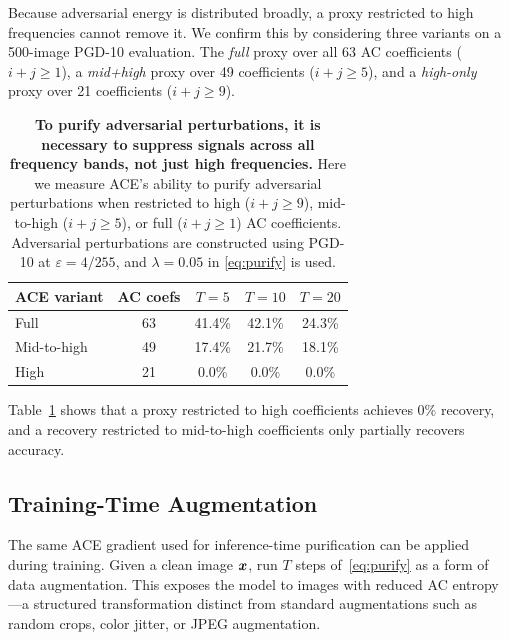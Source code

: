 Because adversarial energy is distributed broadly, a proxy restricted to high frequencies cannot remove it.
We confirm this by considering three variants on a 500-image PGD-10 evaluation.
The \emph{full} proxy over all 63 AC coefficients ($i{+}j\ge1$), a \emph{mid+high} proxy over 49 coefficients ($i{+}j\ge5$), and a \emph{high-only} proxy over 21 coefficients ($i{+}j\ge9$).

\begin{table}[ht]
  \centering
  \caption{
  \textbf{To purify adversarial perturbations, it is necessary to suppress signals across all frequency bands, not just high frequencies.}
  Here we measure ACE's ability to purify adversarial perturbations when restricted to high ($i+j\geq9$), mid-to-high ($i+j\geq5$), or full ($i+j\geq1$) AC coefficients.
  Adversarial perturbations are constructed using PGD-10 at $\varepsilon=4/255$, and $\lambda=0.05$ in \eqref{eq:purify} is used.
  }
  \label{tab:freq_ablation}
  \begin{tabular}{lcccc}
    \toprule
    ACE variant & AC coefs & $T=5$ & $T=10$ & $T=20$ \\
    \midrule
    Full & 63 & 41.4\% & 42.1\% & 24.3\% \\
    Mid-to-high & 49 & 17.4\% &  21.7\% & 18.1\% \\
    High & 21 & 0.0\% & 0.0\% &  0.0\% \\
    \bottomrule
  \end{tabular}
\end{table}

Table~\ref{tab:freq_ablation} shows that a proxy restricted to high coefficients achieves $0\%$ recovery, and a recovery restricted to mid-to-high coefficients only partially recovers accuracy. 

\subsection{Training-Time Augmentation}
\label{sec:aug}

The same ACE gradient used for inference-time purification can be applied during training.
Given a clean image $\boldsymbol{x}$, run $T$ steps of~\eqref{eq:purify} as a form of data augmentation.
This exposes the model to images with reduced AC entropy---a structured transformation distinct from standard augmentations such as random crops, color jitter, or JPEG augmentation.

